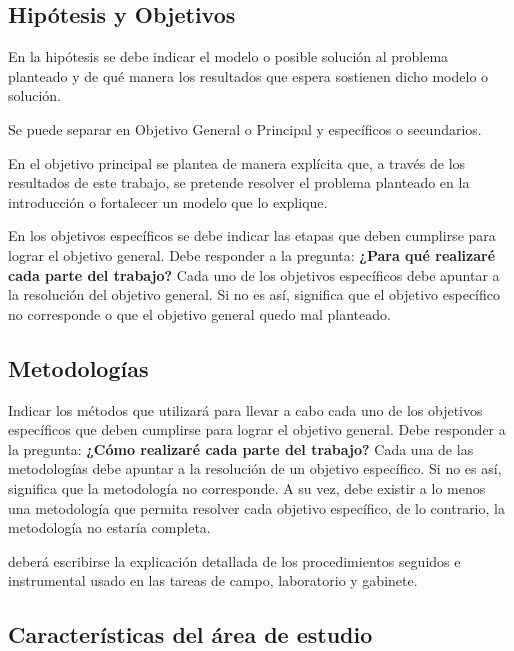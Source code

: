 \subsection{\large Hipótesis y Objetivos}
    
       En la hipótesis se debe indicar el modelo o posible solución al problema planteado y de qué manera los resultados que espera sostienen dicho modelo o solución. \par
     
       Se puede separar en Objetivo General o Principal y específicos o secundarios. \par
   
        En el objetivo principal se plantea de manera explícita que, a través de los resultados de este trabajo, se pretende resolver el problema planteado en la introducción o fortalecer un modelo que lo explique.\par
         
        En los objetivos específicos se debe indicar las etapas que deben cumplirse para lograr el objetivo general. Debe responder a la pregunta: \textbf{¿Para qué realizaré cada parte del trabajo?} Cada uno de los objetivos específicos debe apuntar a la resolución del objetivo general. Si no es así, significa que el objetivo específico no corresponde o que el objetivo general quedo mal planteado.

        
        \subsection{\large Metodologías}
Indicar los métodos que utilizará para llevar a cabo cada uno de los objetivos específicos que deben cumplirse para lograr el objetivo general. Debe responder a la pregunta: \textbf{¿Cómo realizaré cada parte del trabajo?} Cada una de las metodologías debe apuntar a la resolución de un objetivo específico. Si no es así, significa que la metodología no corresponde. A su vez, debe existir a lo menos una metodología que permita resolver cada objetivo específico, de lo contrario, la metodología no estaría completa.\par
            deberá escribirse la explicación detallada de los procedimientos seguidos e instrumental usado en las tareas de campo, laboratorio y gabinete.
     
        \subsection{\large Características del área de estudio}
